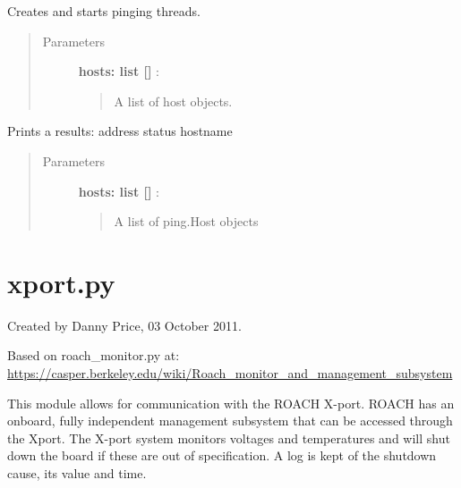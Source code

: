 \documentclass[letterpaper,10pt,english]{sphinxmanual}
\begin{document}

\begin{fulllineitems}
\label{index:ping.pingHosts}
Creates and starts pinging threads.
\begin{quote}\begin{description}
\item[{Parameters }] \leavevmode
\textbf{hosts: list {[}{]}} :
\begin{quote}

A list of host objects.
\end{quote}

\end{description}\end{quote}

\end{fulllineitems}



\begin{fulllineitems}
\label{index:ping.printResults}
Prints a results: address  status  hostname
\begin{quote}\begin{description}
\item[{Parameters }] \leavevmode
\textbf{hosts: list {[}{]}} :
\begin{quote}

A list of ping.Host objects
\end{quote}

\end{description}\end{quote}

\end{fulllineitems}

\label{index:module-xport}

\section{xport.py}
\label{index:xport-py}
Created by Danny Price, 03 October 2011.

Based on roach\_monitor.py at:
\href{https://casper.berkeley.edu/wiki/Roach\_monitor\_and\_management\_subsystem}{https://casper.berkeley.edu/wiki/Roach\_monitor\_and\_management\_subsystem}

This module allows for communication with the ROACH X-port. 
ROACH has an onboard, fully independent management subsystem that can be accessed through the Xport. 
The X-port system monitors voltages and temperatures and will shut down the board 
if these are out of specification. A log is kept of the shutdown cause, its value and time.
\end{document}
